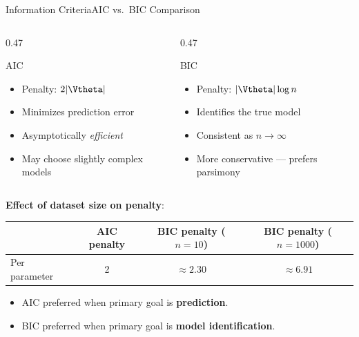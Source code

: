 \begin{frame}{Information Criteria}{AIC vs.\ BIC Comparison}
  \begin{columns}
    \begin{column}{0.47\textwidth}
      \begin{block}{AIC}
        \begin{itemize}
          \item Penalty: $2|\Vtheta|$
          \item Minimizes prediction error
          \item Asymptotically \textit{efficient}
          \item May choose slightly complex models
        \end{itemize}
      \end{block}
    \end{column}
    \begin{column}{0.47\textwidth}
      \begin{block}{BIC}
        \begin{itemize}
          \item Penalty: $|\Vtheta|\log n$
          \item Identifies the true model
          \item Consistent as $n \to \infty$
          \item More conservative — prefers parsimony
        \end{itemize}
      \end{block}
    \end{column}
  \end{columns}

  \bigskip
  \textbf{Effect of dataset size on penalty}:

  \begin{center}
  \begin{tabular}{lccc}
    \toprule
    & AIC penalty & BIC penalty ($n=10$) & BIC penalty ($n=1000$)\\
    \midrule
    Per parameter & 2 & $\approx 2.30$ & $\approx 6.91$\\
    \bottomrule
  \end{tabular}
  \end{center}

  \begin{itemize}
    \item AIC preferred when primary goal is \textbf{prediction}.
    \item BIC preferred when primary goal is \textbf{model identification}.
  \end{itemize}
\end{frame}

